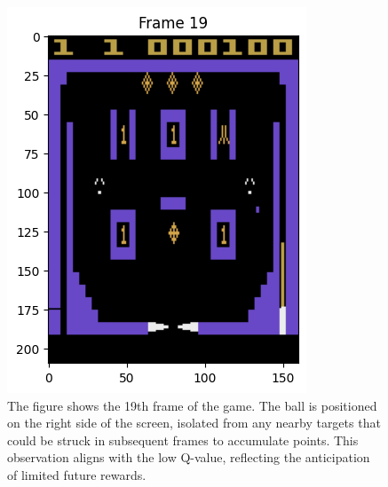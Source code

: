 \begin{figure}
    \centering
    \includegraphics[width=0.7\linewidth]{graphics/frame19.png}
    \caption{The figure shows the 19th frame of the game. The ball is positioned on the right side of the screen, isolated from any nearby targets that could be struck in subsequent frames to accumulate points. This observation aligns with the low Q-value, reflecting the anticipation of limited future rewards.}
    \label{fig: frame19}
\end{figure}

